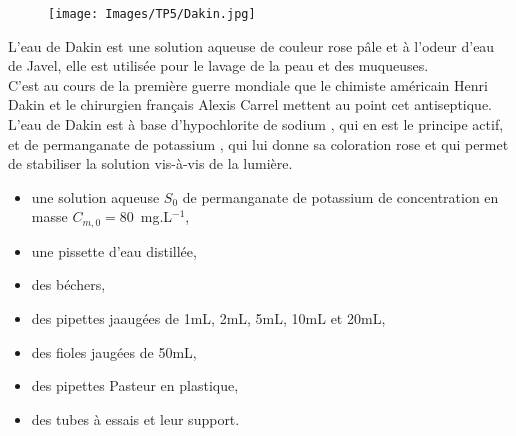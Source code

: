 \begin{tcolorbox}[colback=orange!5!white,colframe=orange!75!black,title= Scénario:]
\begin{figure}
\vspace{-0.6cm}
    \centering
      \texttt{[image: Images/TP5/Dakin.jpg]}
  \end{figure}
L’eau de Dakin est une solution aqueuse de couleur rose pâle et à l’odeur d’eau de Javel, elle est utilisée pour le lavage de la peau et des muqueuses.\\
C’est au cours de la première guerre mondiale que le chimiste américain Henri Dakin et le chirurgien français Alexis Carrel mettent au point cet antiseptique.\\
L’eau de Dakin est à base d’hypochlorite de sodium , qui en est le principe actif, et de permanganate de potassium , qui lui donne sa coloration rose et qui permet de stabiliser la solution vis-à-vis de la lumière.\\

\end{tcolorbox}
\newpage

\begin{mdframed}[style=autreexo]
\textbf{}
\begin{itemize}
    \item une solution aqueuse $S_0$ de permanganate de potassium  de concentration en masse $C_{m,0}=80$~mg.L$^{-1}$, 
    \item une pissette d'eau distillée,
    \item des béchers,
    \item des pipettes jaaugées de 1mL, 2mL, 5mL, 10mL et 20mL,
    \item des fioles jaugées de 50mL,
    \item des pipettes Pasteur en plastique,
    \item des tubes à essais et leur support.    
\end{itemize}
\end{mdframed}


